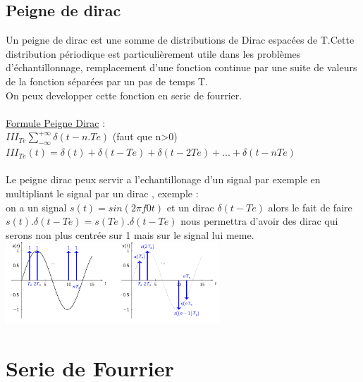 \documentclass[a4paper,8pt,openany]{book}
\begin{document}
\section{Peigne de dirac}
Un peigne de dirac est une somme de distributions de Dirac espacées de T.Cette distribution périodique est particulièrement utile dans les problèmes d'échantillonnage, remplacement d'une fonction continue par une suite de valeurs de la fonction séparées par un pas de temps T.\\
On peux developper cette fonction en serie de fourrier.\\
\\
\underline{Formule Peigne Dirac} :\\
$III_{Te}\sum_{-\infty}^{+\infty} \delta(t-n.Te)$ (faut que n>0)\\
$III_{Te}(t)= \delta(t)+\delta(t-Te)+\delta(t-2Te)+...+\delta(t-nTe)$\\
\\
Le peigne dirac peux servir a l'echantillonage d'un signal par exemple en multipliant le signal par un dirac , exemple :\\
on a un signal $s(t)=sin(2\pi f0t)$ et un dirac $\delta(t-Te)$ alors le fait de faire $s(t).\delta(t-Te)=s(Te).\delta(t-Te)$ nous permettra d'avoir des dirac qui serons non plus centr\'ee sur 1 mais sur le signal lui meme.\\
\includegraphics[width=0.60\textwidth,center]{img/peigne_dirac.png}

\chapter{Serie de Fourrier}
\end{document}
